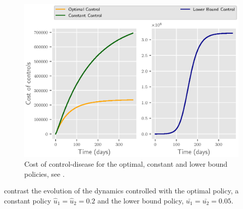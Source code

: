 \begin{figure}[H]
  \centering
  \includegraphics{Figures/figure_3_sars}
  \caption{
    Cost of control-disease for the optimal, constant and lower bound
    policies, see .
  }
  \label{fig:figure3sars}
\end{figure}

 contrast the evolution of the dynamics controlled with
the optimal policy, a constant policy 
$\widehat{u}_1 = \widehat{u}_2=\num{0.2}$ and the lower bound policy,
$\bar{u_1} = \bar{u_2} = \num{0.05}$.